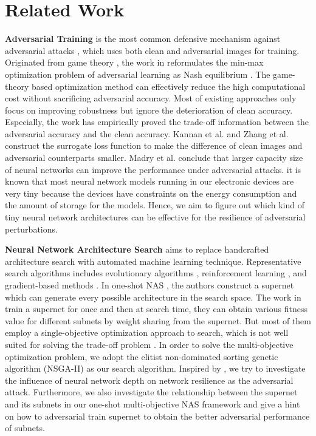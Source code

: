 \documentclass[journal]{IEEEtran}
\begin{document}
\section{Related Work}
\textbf{Adversarial Training} is the most common defensive mechanism against adversarial attacks \cite{goodfellow:goodfellow2014explaining}, which uses both clean and adversarial images for training. Originated from game theory \cite{myerson2013game}, the work in \cite{grosshans2013bayesian} reformulates the min-max optimization problem of adversarial learning as Nash equilibrium \cite{daskalakis2009complexity}. The game-theory based optimization method \cite{zhang:zhang2019you} can effectively reduce the high computational cost without sacrificing adversarial accuracy. Most of existing approaches only focus on improving robustness but ignore the deterioration of clean accuracy. Especially, the work \cite{tsipras:tsipras2018robustness} has empirically proved the trade-off information between the adversarial accuracy and the clean accuracy. Kannan et al. \cite{kannan2018adversarial} and Zhang et al. \cite{zhang:zhang2019theoretically} construct the surrogate loss function to make the difference of clean images and adversarial counterparts smaller. Madry et al. \cite{madry:madry2017towards} conclude that larger capacity size of neural networks can improve the performance under adversarial attacks. it is known that most neural network models running in our electronic devices are very tiny because the devices have constraints on the energy consumption and the amount of storage for the models. Hence, we aim to figure out which kind of tiny neural network architectures can be effective for the resilience of adversarial perturbations. 

\textbf{Neural Network Architecture Search} aims to replace handcrafted architecture search with automated machine learning technique. Representative search algorithms includes evolutionary algorithms \cite{xie:xie2017genetic, real2019regularized}, reinforcement learning \cite{zoph:zoph2018learning, pham:pham2018efficient}, and gradient-based methods \cite{liu:liu2018darts, dong:dong2019one,guo2020meets}. In one-shot NAS \cite{bender2018understanding}, the authors \cite{bender2018understanding} construct a supernet which can generate every possible architecture in the search space. The work in \cite{bender2018understanding} train a supernet for once and then at search time, they can obtain various fitness value for different subnets by weight sharing from the supernet. But most of them employ a single-objective optimization approach to search, which is not well suited for solving the trade-off problem \cite{tsipras:tsipras2018robustness}. In order to solve the multi-objective optimization problem, we adopt the elitist non-dominated sorting genetic algorithm (NSGA-II) \cite{deb2002fast} as our search algorithm. Inspired by \cite{xie2019intriguing}, we try to investigate the influence of neural network depth on network resilience as the adversarial attack. Furthermore, we also investigate the relationship between the supernet and its subnets in our one-shot multi-objective NAS framework and give a hint on how to adversarial train supernet to obtain the better adversarial performance of subnets. 
\end{document}
